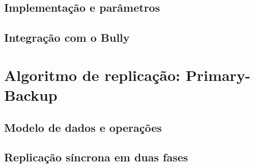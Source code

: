 \subsection{Implementação e parâmetros}

\subsection{Integração com o Bully}

\section{Algoritmo de replicação: Primary-Backup}

\subsection{Modelo de dados e operações}

\subsection{Replicação síncrona em duas fases}

